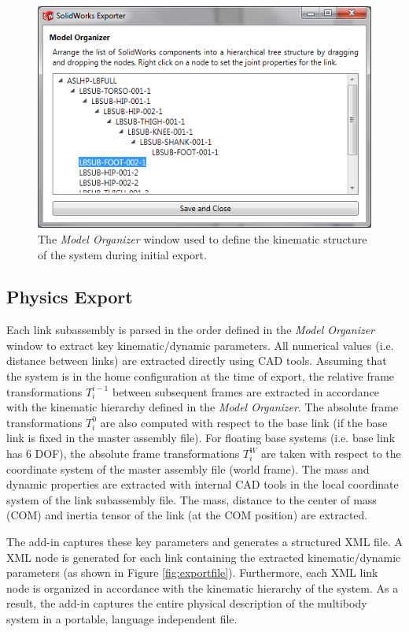 \begin{figure}[!h]
	\centering
    \includegraphics[scale=1.0]{fig/toolchain/modelorg.png}
  	\caption{The \emph{Model Organizer} window used to define the kinematic structure of the system during initial export.}
	\label{fig:modelorg}
\end{figure}

\subsection{Physics Export} %
\label{sub:physics_export}
Each link subassembly is parsed in the order defined in the \emph{Model Organizer} window to extract key kinematic/dynamic parameters. All numerical values (i.e. distance between links) are extracted directly using CAD tools. Assuming that the system is in the home configuration at the time of export, the relative frame transformations $T^{i-1}_{i}$  between subsequent frames are extracted in accordance with the kinematic hierarchy defined in the \emph{Model Organizer}. The absolute frame transformations $T^{0}_{i}$ are also computed with respect to the base link (if the base link is fixed in the master assembly file). For floating base systems (i.e. base link has 6 DOF), the absolute frame transformations $T^{W}_{i}$ are taken with respect to the coordinate system of the master assembly file (world frame). The mass and dynamic properties are extracted with internal CAD tools in the local coordinate system of the link subassembly file. The mass, distance to the center of mass (COM) and inertia tensor of the link (at the COM position) are extracted.

The add-in captures these key parameters and generates a structured XML file. A XML node is generated for each link containing the extracted kinematic/dynamic parameters (as shown in Figure \ref{fig:exportfile}). Furthermore, each XML link node is organized in accordance with the kinematic hierarchy of the system. As a result, the add-in captures the entire physical description of the multibody system in a portable, language independent file.

